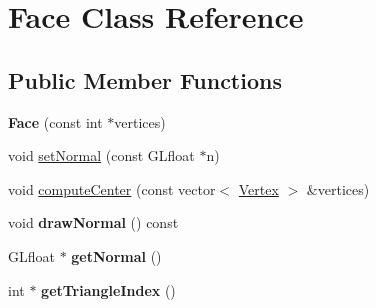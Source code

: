 \hypertarget{classFace}{\section{Face Class Reference}
\label{classFace}
}
\subsection*{Public Member Functions}
\begin{DoxyCompactItemize}
\item 
\hypertarget{classFace_a7655f5c584e03c266cba1cfbd6877e05}{{\bfseries Face} (const int $\ast$vertices)}\label{classFace_a7655f5c584e03c266cba1cfbd6877e05}

\item 
void \hyperlink{classFace_af200efb8cdd7ee66139bdf8be198c53e}{set\-Normal} (const G\-Lfloat $\ast$n)
\item 
void \hyperlink{classFace_a1486f1762166b2cc77b1806dfcc4a12a}{compute\-Center} (const vector$<$ \hyperlink{classVertex}{Vertex} $>$ \&vertices)
\item 
\hypertarget{classFace_a17212b0377c8279369d1b57bff5df503}{void {\bfseries draw\-Normal} () const }\label{classFace_a17212b0377c8279369d1b57bff5df503}

\item 
\hypertarget{classFace_a107b157049a2b38e12b4666babf62823}{G\-Lfloat $\ast$ {\bfseries get\-Normal} ()}\label{classFace_a107b157049a2b38e12b4666babf62823}

\item 
\hypertarget{classFace_a0e8c46dcca387d9dcdc0c4067cbea982}{int $\ast$ {\bfseries get\-Triangle\-Index} ()}\label{classFace_a0e8c46dcca387d9dcdc0c4067cbea982}

\end{DoxyCompactItemize}



